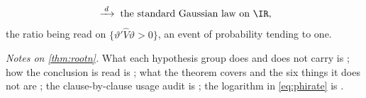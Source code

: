 \begin{theorem}
\[\;\xrightarrow{\;d\;}\;\text{the standard Gaussian law on }\IR ,
\]
the ratio being read on $\{\vartheta'\hat V\vartheta>0\}$, an event of probability tending to one.
\end{theorem}

\noindent\emph{Notes on \cref{thm:rootn}.} What each hypothesis group does and does not carry is
; how the conclusion is read is ; what the theorem
covers and the six things it does not are ; the clause-by-clause usage audit is
; the logarithm in \eqref{eq:phirate} is .

